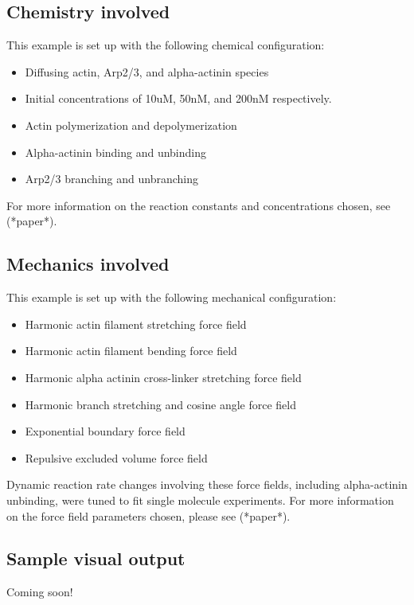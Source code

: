 \documentclass[11pt, oneside]{article}   	%
\begin{document}
\subsection{Chemistry involved}

This example is set up with the following chemical configuration:

\begin{itemize}
\item Diffusing actin, Arp2/3, and alpha-actinin species
\item Initial concentrations of 10uM, 50nM, and 200nM respectively.
\item Actin polymerization and depolymerization
\item Alpha-actinin binding and unbinding
\item Arp2/3 branching and unbranching

\end{itemize}

\noindent For more information on the reaction constants and concentrations chosen, see (*paper*).

\subsection{Mechanics involved}

This example is set up with the following mechanical configuration:

\begin{itemize}
\item Harmonic actin filament stretching force field
\item Harmonic actin filament bending force field
\item Harmonic alpha actinin cross-linker stretching force field
\item Harmonic branch stretching and cosine angle force field
\item Exponential boundary force field
\item Repulsive excluded volume force field
\end{itemize}

\noindent Dynamic reaction rate changes involving these force fields, including alpha-actinin unbinding, were tuned to fit single molecule experiments.\newline\newline
\noindent For more information on the force field parameters chosen, please see (*paper*). 


\subsection{Sample visual output}

Coming soon!
\end{document}
